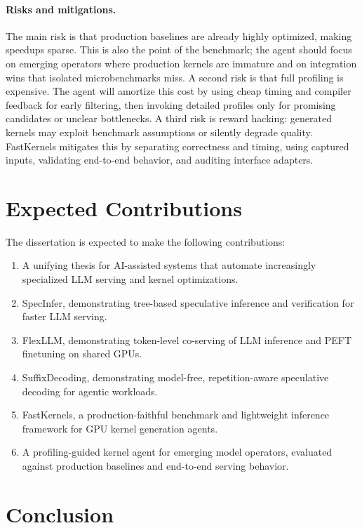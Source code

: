 \documentclass[11pt]{article}
\newcommand{\SpecInfer}{SpecInfer}
\newcommand{\FlexLLM}{FlexLLM}
\newcommand{\SuffixDecoding}{SuffixDecoding}
\newcommand{\FastKernels}{FastKernels}
\begin{document}
\paragraph{Risks and mitigations.}
The main risk is that production baselines are already highly optimized, making speedups sparse. This is also the point of the benchmark; the agent should focus on emerging operators where production kernels are immature and on integration wins that isolated microbenchmarks miss. A second risk is that full profiling is expensive. The agent will amortize this cost by using cheap timing and compiler feedback for early filtering, then invoking detailed profiles only for promising candidates or unclear bottlenecks. A third risk is reward hacking: generated kernels may exploit benchmark assumptions or silently degrade quality. \FastKernels{} mitigates this by separating correctness and timing, using captured inputs, validating end-to-end behavior, and auditing interface adapters.

\section{Expected Contributions}

The dissertation is expected to make the following contributions:

\begin{enumerate}[leftmargin=*, itemsep=2pt]
\item A unifying thesis for AI-assisted systems that automate increasingly specialized LLM serving and kernel optimizations.
\item \SpecInfer{}, demonstrating tree-based speculative inference and verification for faster LLM serving.
\item \FlexLLM{}, demonstrating token-level co-serving of LLM inference and PEFT finetuning on shared GPUs.
\item \SuffixDecoding{}, demonstrating model-free, repetition-aware speculative decoding for agentic workloads.
\item \FastKernels{}, a production-faithful benchmark and lightweight inference framework for GPU kernel generation agents.
\item A profiling-guided kernel agent for emerging model operators, evaluated against production baselines and end-to-end serving behavior.
\end{enumerate}

\section{Conclusion}
\end{document}
